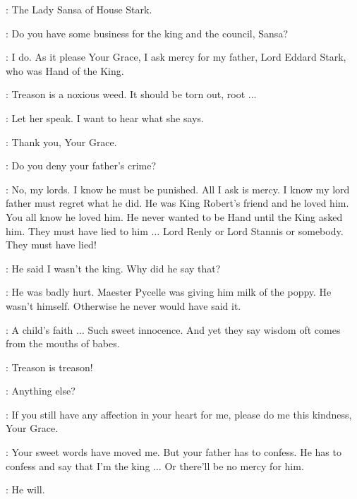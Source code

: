 \HERALD: The Lady Sansa of House Stark. 

\CERSEI: Do you have some business for the king and the council, Sansa? 

\SANSA: I do.  As it please Your Grace, I ask mercy for my father, Lord Eddard Stark, who was Hand of the King. 

\PYCELLE: Treason is a noxious weed. It should be torn out, root $\ldots$  

\JOFFREY: Let her speak. I want to hear what she says. 

\SANSA: Thank you, Your Grace. 

\LITTLEFINGER: Do you deny your father's crime? 

\SANSA: No, my lords. I know he must be punished. All I ask is mercy. I know my lord father must regret what he did. He was King Robert's friend and he loved him. You all know he loved him. He never wanted to be Hand until the King asked him. They must have lied to him $\ldots$ Lord Renly or Lord Stannis or somebody. They must have lied! 

\JOFFREY: He said I wasn't the king. Why did he say that? 

\SANSA: He was badly hurt. Maester Pycelle was giving him milk of the poppy. He wasn't himself. Otherwise he never would have said it. 

\VARYS: A child's faith $\ldots$ Such sweet innocence. And yet they say wisdom oft comes from the mouths of babes. 

\PYCELLE: Treason is treason! 

\JOFFREY: Anything else? 

\SANSA: If you still have any affection in your heart for me, please do me this kindness, Your Grace. 

\JOFFREY: Your sweet words have moved me. But your father has to confess. He has to confess and say that I'm the king $\ldots$ Or there'll be no mercy for him. 

\SANSA: He will. 


